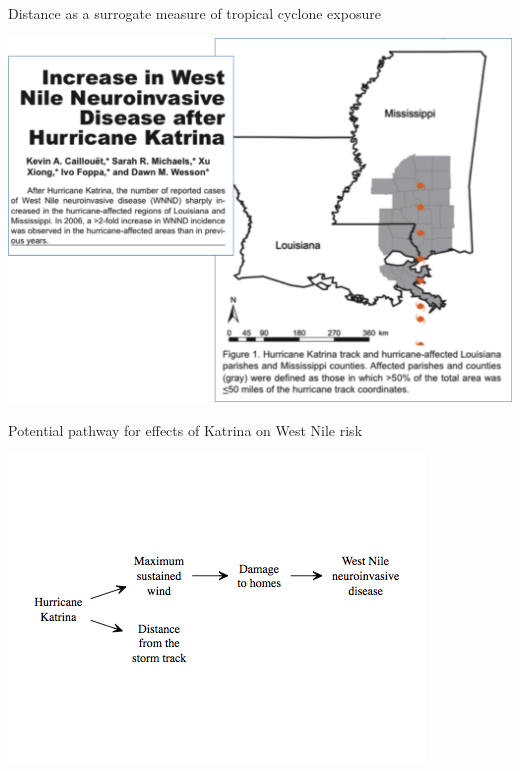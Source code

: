 \documentclass[ignorenonframetext,]{beamer}
\begin{document}
\begin{frame}{Distance as a surrogate measure of tropical cyclone
exposure}

\begin{center}\includegraphics[width=\textwidth]{figures/katrina_west_nile} \end{center}

\end{frame}

\begin{frame}{Potential pathway for effects of Katrina on West Nile
risk}

\begin{center}\includegraphics[width=\textwidth]{figures/causal_wind} \end{center}

\end{frame}
\end{document}
